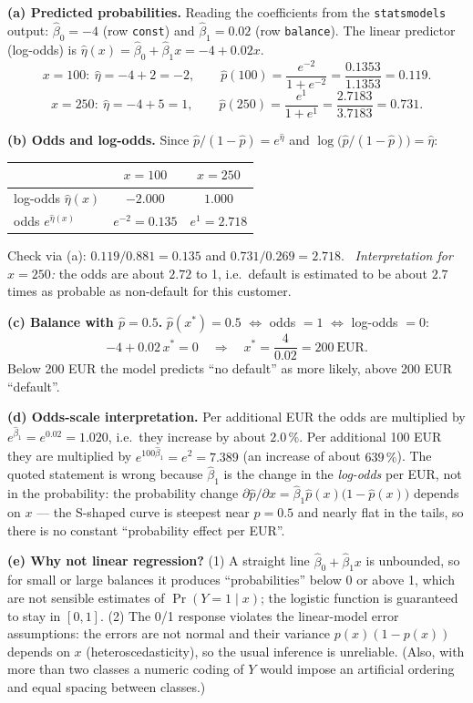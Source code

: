 \documentclass[11pt,a4paper]{article}
\begin{document}
\ifdefined\withsolutions
\begin{solutionbox}
\textbf{(a) Predicted probabilities.} Reading the coefficients from the \texttt{statsmodels}
output: $\hat{\beta}_0=-4$ (row \texttt{const}) and $\hat{\beta}_1=0.02$ (row \texttt{balance}).
The linear predictor (log-odds) is
$\hat{\eta}(x)=\hat{\beta}_0+\hat{\beta}_1x=-4+0.02x$.
\[
x=100:\ \hat{\eta}=-4+2=-2,\qquad
\hat{p}(100)=\frac{e^{-2}}{1+e^{-2}}=\frac{0.1353}{1.1353}=0.119 .
\]
\[
x=250:\ \hat{\eta}=-4+5=1,\qquad
\hat{p}(250)=\frac{e^{1}}{1+e^{1}}=\frac{2.7183}{3.7183}=0.731 .
\]

\medskip
\textbf{(b) Odds and log-odds.} Since
$\hat{p}/(1-\hat{p})=e^{\hat{\eta}}$ and $\log\big(\hat{p}/(1-\hat{p})\big)=\hat{\eta}$:
\begin{center}
\begin{tabular}{lcc}
\toprule
 & $x=100$ & $x=250$\\
\midrule
log-odds $\hat{\eta}(x)$ & $-2.000$ & $1.000$\\
odds $e^{\hat{\eta}(x)}$ & $e^{-2}=0.135$ & $e^{1}=2.718$\\
\bottomrule
\end{tabular}
\end{center}
Check via (a): $0.119/0.881=0.135$ and $0.731/0.269=2.718$. \checkmark\
\emph{Interpretation for $x=250$:} the odds are about $2.72$ to 1, i.e.\ default is
estimated to be about $2.7$ times as probable as non-default for this customer.

\medskip
\textbf{(c) Balance with $\hat{p}=0.5$.}
$\hat{p}(x^{*})=0.5$ $\iff$ odds $=1$ $\iff$ log-odds $=0$:
\[
-4+0.02\,x^{*}=0
\quad\Longrightarrow\quad
x^{*}=\frac{4}{0.02}=200\ \text{EUR}.
\]
Below 200 EUR the model predicts ``no default'' as more likely, above 200 EUR ``default''.

\medskip
\textbf{(d) Odds-scale interpretation.}
Per additional EUR the odds are multiplied by
$e^{\hat{\beta}_1}=e^{0.02}=1.020$, i.e.\ they increase by about $2.0\,\%$.
Per additional 100 EUR they are multiplied by
$e^{100\hat{\beta}_1}=e^{2}=7.389$ (an increase of about $639\,\%$).
The quoted statement is wrong because $\hat{\beta}_1$ is the change in the
\emph{log-odds} per EUR, not in the probability: the probability change
$\partial\hat{p}/\partial x=\hat{\beta}_1\hat{p}(x)\bigl(1-\hat{p}(x)\bigr)$ depends on $x$
--- the S-shaped curve is steepest near $\hat{p}=0.5$ and nearly flat in the tails, so there
is no constant ``probability effect per EUR''.

\medskip
\textbf{(e) Why not linear regression?}
(1) A straight line $\hat{\beta}_0+\hat{\beta}_1x$ is unbounded, so for small or large
balances it produces ``probabilities'' below 0 or above 1, which are not sensible
estimates of $\Pr(Y=1\mid x)$; the logistic function is guaranteed to stay in $[0,1]$.
(2) The 0/1 response violates the linear-model error assumptions: the errors are not
normal and their variance $p(x)(1-p(x))$ depends on $x$ (heteroscedasticity), so the usual
inference is unreliable. (Also, with more than two classes a numeric coding of $Y$ would
impose an artificial ordering and equal spacing between classes.)
\end{solutionbox}
\fi
\end{document}
